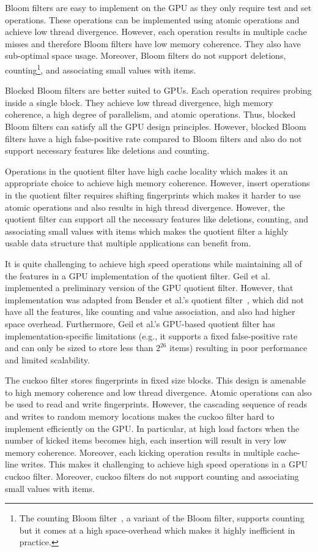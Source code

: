 Bloom filters are easy to implement on the GPU as they only require test and set
operations. These operations can be implemented using atomic operations and
achieve low thread divergence. However, each operation results in multiple cache
misses and therefore Bloom filters have low memory coherence. They also have
sub-optimal space usage. Moreover, Bloom filters do not support deletions,
counting\footnote{The counting Bloom filter~\cite{FanCaAl00}, a variant of the
Bloom filter, supports counting but it comes at a high space-overhead which
makes it highly inefficient in practice.}, and associating small values with
items.

Blocked Bloom filters are better suited to GPUs.  Each operation requires
probing inside a single block. They achieve low thread divergence, high memory
coherence, a high degree of parallelism, and atomic operations. Thus, blocked
Bloom filters can satisfy all the GPU design principles. However, blocked Bloom
filters have a high false-positive rate compared to Bloom filters and also do
not support necessary features like deletions and counting.

Operations in the quotient filter have high cache locality which makes it an
appropriate choice to achieve high memory coherence. However, insert operations
in the quotient filter requires shifting fingerprints which makes it harder to
use atomic operations and also results in high thread divergence. However, the
quotient filter can support all the necessary features like deletions, counting,
and associating small values with items which makes the quotient filter a highly
usable data structure that multiple applications can benefit from.

It is quite challenging to achieve high speed operations while maintaining all
of the features in a GPU implementation of the quotient filter. Geil et
al.~\cite{Geil:2018:QFA} implemented a preliminary version of the GPU quotient filter.
However, that implementation was adapted from Bender et al.'s quotient
filter~\cite{BenderFaJo12a}, which did not have all the features, like counting
and value association, and also had higher space overhead. Furthermore, Geil et
al.'s GPU-based quotient filter has implementation-specific limitations (e.g., it
supports a fixed false-positive rate and can only be sized to store less than
$2^{26}$ items) resulting in poor performance and limited scalability.

The cuckoo filter stores fingerprints in fixed size blocks. This design is
amenable to high memory coherence and low thread divergence. Atomic operations
can also be used to read and write fingerprints. However, the cascading sequence
of reads and writes to random memory locations makes the cuckoo filter hard to
implement efficiently on the GPU\@. In particular, at high load factors when the
number of kicked items becomes high, each insertion will result in very low
memory coherence. Moreover, each kicking operation results in multiple
cache-line writes. This makes it challenging to achieve high speed operations in
a GPU cuckoo filter. Moreover, cuckoo filters do not support counting and
associating small values with items.

